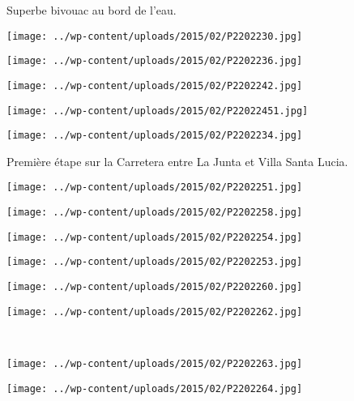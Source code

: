 \pagebreak
 Superbe bivouac au bord de l'eau.
\begin{center} \texttt{[image: ../wp-content/uploads/2015/02/P2202230.jpg]} \end{center}
\begin{center} \texttt{[image: ../wp-content/uploads/2015/02/P2202236.jpg]} \end{center}
\begin{center} \texttt{[image: ../wp-content/uploads/2015/02/P2202242.jpg]} \end{center}
\begin{center} \texttt{[image: ../wp-content/uploads/2015/02/P22022451.jpg]} \end{center}
\begin{center} \texttt{[image: ../wp-content/uploads/2015/02/P2202234.jpg]} \end{center}

Première étape sur la Carretera entre La Junta et Villa Santa Lucia.
\begin{center} \texttt{[image: ../wp-content/uploads/2015/02/P2202251.jpg]} \end{center}
\begin{center} \texttt{[image: ../wp-content/uploads/2015/02/P2202258.jpg]} \end{center}
\begin{center} \texttt{[image: ../wp-content/uploads/2015/02/P2202254.jpg]} \end{center}
\begin{center} \texttt{[image: ../wp-content/uploads/2015/02/P2202253.jpg]} \end{center}
\begin{center} \texttt{[image: ../wp-content/uploads/2015/02/P2202260.jpg]} \end{center}
\begin{center} \texttt{[image: ../wp-content/uploads/2015/02/P2202262.jpg]} \end{center}
\vspace{-\topsep}
\vspace{-8.5mm}

\pagebreak
~
\begin{center} \texttt{[image: ../wp-content/uploads/2015/02/P2202263.jpg]} \end{center}
\begin{center} \texttt{[image: ../wp-content/uploads/2015/02/P2202264.jpg]} \end{center}
\vspace{-\topsep}
\vspace{-3.25mm}

